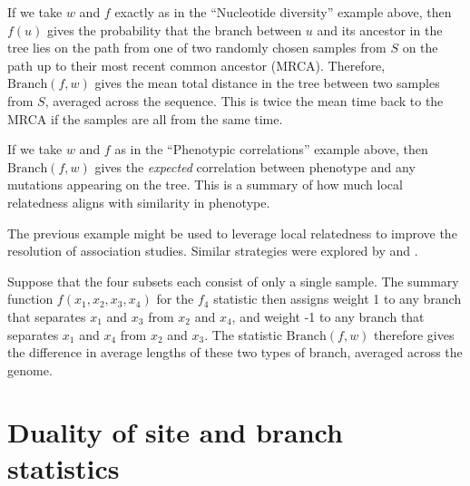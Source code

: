 \documentclass{article}
\newcommand{\branch}{\mbox{Branch}} %
\newcommand{\iw}{w} %
\begin{document}
\begin{example} \label{ex:branch_diversity}
    If we take $\iw$ and $f$ exactly as in the ``Nucleotide diversity'' example above,
    then $f(u)$ gives the probability that the branch between $u$ and its ancestor in the tree
    lies on the path from one of two randomly chosen samples from $S$
    on the path up to their most recent common ancestor (MRCA).
    Therefore, $\branch(f, \iw)$
    gives the mean total distance in the tree between two samples from $S$,
    averaged across the sequence.
    This is twice the mean time back to the MRCA if the samples are all from the same time.
\end{example}

\begin{example} \label{ex:branch_correlation}
    If we take $\iw$ and $f$ as in the ``Phenotypic correlations'' example above,
    then $\branch(f, \iw)$ gives the \emph{expected} correlation between phenotype and any mutations
    appearing on the tree. This is a summary of how much local relatedness
    aligns with similarity in phenotype.
\end{example}

The previous example might be used to leverage local relatedness
to improve the resolution of association studies.
Similar strategies were explored by \citet{zollner2005coalescent} and \citet{minichiello2006mapping}.

\begin{example}[Patterson's $f_4$] \label{ex:branch_f4} 
    Suppose that the four subsets each consist of only a single sample.
    The summary function $f(x_1, x_2, x_3, x_4)$ for the $f_4$ statistic
    then assigns weight 1 to any branch that separates $x_1$ and $x_3$ from $x_2$ and $x_4$,
    and weight -1 to any branch that separates $x_1$ and $x_4$ from $x_2$ and $x_3$.
    The statistic $\branch(f, \iw)$ therefore
    gives the difference in average lengths of these two types of branch,
    averaged across the genome.
\end{example}



\section*{Duality of site and branch statistics}
\end{document}
